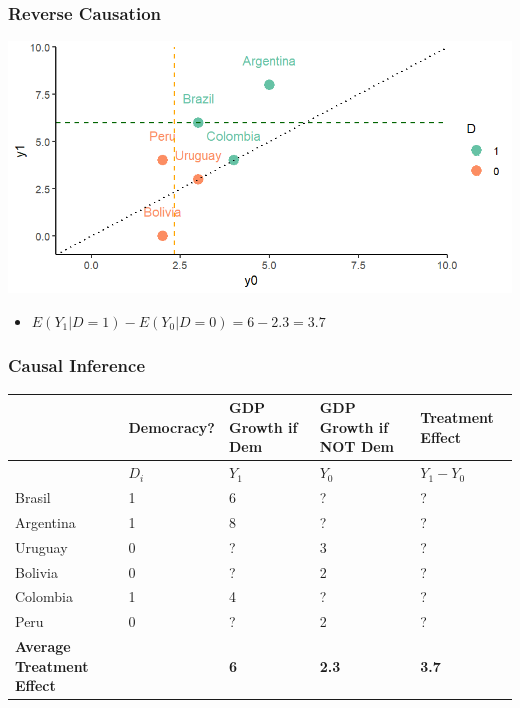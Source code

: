 \documentclass[xcolor=x11names,compress]{beamer}\usepackage[]{graphicx}\usepackage[]{color}
\makeatletter
\def\maxwidth{ %
  \ifdim\Gin@nat@width>\linewidth
    \linewidth
  \else
    \Gin@nat@width
  \fi
}
\newenvironment{knitrout}{}{} %
\renewcommand{\(}{\begin{columns}}
\renewcommand{\)}{\end{columns}}
\newcommand{\<}[1]{\begin{column}{#1}}
\renewcommand{\>}{\end{column}}
\makeatother
\begin{document}
\begin{frame}
\frametitle{Reverse Causation}
\begin{knitrout}
\color{fgcolor}
\includegraphics[width=\maxwidth]{figure/Chart_2-1} 

\end{knitrout}
\begin{itemize}
\item $E(Y_1|D=1)-E(Y_0|D=0) = 6 - 2.3 = 3.7$
\end{itemize}
\end{frame}

\begin{frame}
\frametitle{Causal Inference}
\footnotesize
\footnotesize
\begin{table}[htbp]
  \centering
    \begin{tabular}{|p{1.8cm}|p{1.8cm}|p{1.8cm}|p{1.8cm}|p{1.8cm}|}
    \hline
           & \multicolumn{1}{p{1.8cm}|}{Democracy?} & \multicolumn{1}{p{1.8cm}|}{GDP Growth if Dem} & \multicolumn{1}{p{1.8cm}|}{GDP Growth if NOT Dem} & \textbf{Treatment Effect} \bigstrut\\
    \hline
          \multicolumn{1}{|p{1.8cm}|}{} & \multicolumn{1}{p{1.8cm}|}{$D_i$} & \multicolumn{1}{p{2cm}|}{$Y_1$} & \multicolumn{1}{p{2.2cm}|}{$Y_0$} & \multicolumn{1}{p{1.8cm}|}{$Y_{1} - Y_{0}$} \bigstrut\\
    \hline
    Brasil & 1 & 6     & ?     & ? \bigstrut\\
    \hline
    Argentina & 1 & 8    & ?     & ? \bigstrut\\
    \hline
    Uruguay & 0 & ? & 3 & ?  \bigstrut\\
    \hline
    Bolivia & 0 & ?     & 2     & ? \bigstrut\\
    \hline
    Colombia & 1 & 4    & ?    & ? \bigstrut\\
    \hline
    Peru & 0 & ?     & 2     & ? \bigstrut\\
    \hline
    \textbf{Average Treatment Effect} & & \textbf{6} & \textbf{2.3} & \textbf{3.7} \bigstrut\\
    \hline
    \end{tabular}%
  \label{tab:addlabel}%
\end{table}%
\normalsize
\end{frame}
\end{document}
